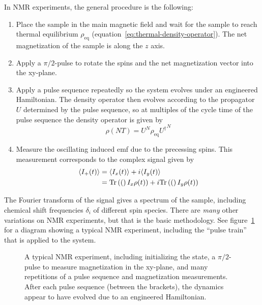 In NMR experiments, the general procedure is the following:
\begin{enumerate}
    \item Place the sample in the main magnetic field and wait for the sample to reach thermal equilibrium $\rho_\text{eq}$ (equation~\ref{eq:thermal-density-operator}). The net magnetization of the sample is along the $z$ axis.
    \item Apply a $\pi/2$-pulse to rotate the spins and the net magnetization vector into the xy-plane.
    \item Apply a pulse sequence repeatedly so the system evolves under an engineered Hamiltonian. The density operator then evolves according to the propagator $U$ determined by the pulse sequence, so at multiples of the cycle time of the pulse sequence the density operator is given by
    \[
    \rho(NT) = U^N \rho_\text{eq} {U^\dagger}^N
    \]
    \item Measure the oscillating induced emf due to the precessing spins. This measurement corresponds to the complex signal given by
    \begin{equation*}
    \begin{aligned}
        \langle I_+(t) \rangle &= \langle I_x(t) \rangle + i \langle I_y(t) \rangle \\
            &= \text{Tr}\left( ( \right)I_x \rho(t)) + i\text{Tr}\left( ( \right)I_y \rho(t))
    \end{aligned}
    \end{equation*}
\end{enumerate}
The Fourier transform of the signal gives a spectrum of the sample, including chemical shift frequencies $\delta_i$ of different spin species. There are \emph{many} other variations on NMR experiments, but that is the basic methodology. See figure~\ref{fig:NMR-Pulse-Train} for a diagram showing a typical NMR experiment, including the ``pulse train'' that is applied to the system.

\begin{figure}[H]
    \centering
    
    \caption{A typical NMR experiment, including initializing the state, a $\pi/2$-pulse to measure magnetization in the xy-plane, and many repetitions of a pulse sequence and magnetization measurements. After each pulse sequence (between the brackets), the dynamics appear to have evolved due to an engineered Hamiltonian.}
    \label{fig:NMR-Pulse-Train}
\end{figure}

